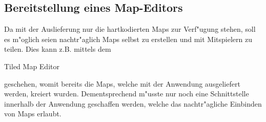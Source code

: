 \documentclass[enabledeprecatedfontcommands,fontsize=12pt,paper=a4,twoside,parskip=half]{scrartcl}
\begin{document}
\subsection{Bereitstellung eines Map-Editors}
Da mit der Auslieferung nur die hartkodierten Maps zur Verf"ugung stehen, soll es m"oglich seien nachtr"aglich Maps selbst zu erstellen und mit Mitspielern zu teilen. Dies kann z.B. mittels dem \begin{it}Tiled Map Editor\end{it} geschehen, womit bereits die Maps, welche mit der Anwendung ausgeliefert werden, kreiert wurden. Dementsprechend m"usste nur noch eine Schnittstelle innerhalb der Anwendung geschaffen werden, welche das nachtr"agliche Einbinden von Maps erlaubt.

\end{document}
